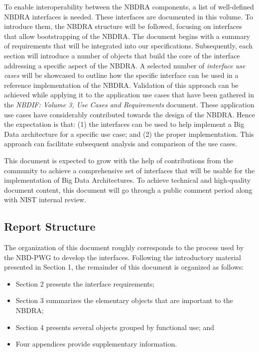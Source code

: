 \documentclass[9pt,]{article}
\providecommand{\tightlist}{%
  \setlength{\itemsep}{0pt}\setlength{\parskip}{0pt}}
\begin{document}
To enable interoperability between the NBDRA components, a list of
well-defined NBDRA interfaces is needed. These interfaces are documented
in this volume. To introduce them, the NBDRA structure will be followed,
focusing on interfaces that allow bootstrapping of the NBDRA. The
document begins with a summary of requirements that will be integrated
into our specifications. Subsequently, each section will introduce a
number of objects that build the core of the interface addressing a
specific aspect of the NBDRA. A selected number of \emph{interface use
cases} will be showcased to outline how the specific interface can be
used in a reference implementation of the NBDRA. Validation of this
approach can be achieved while applying it to the application use cases
that have been gathered in the \emph{NBDIF: Volume 3, Use Cases and
Requirements} document. These application use cases have considerably
contributed towards the design of the NBDRA. Hence the expectation is
that: (1) the interfaces can be used to help implement a Big Data
architecture for a specific use case; and (2) the proper implementation.
This approach can facilitate subsequent analysis and comparison of the
use cases.

This document is expected to grow with the help of contributions from
the community to achieve a comprehensive set of interfaces that will be
usable for the implementation of Big Data Architectures. To achieve
technical and high-quality document content, this document will go
through a public comment period along with NIST internal review.

\hypertarget{report-structure}{%
\subsection{Report Structure}\label{report-structure}}

The organization of this document roughly corresponds to the process
used by the NBD-PWG to develop the interfaces. Following the
introductory material presented in Section 1, the remainder of this
document is organized as follows:

\begin{itemize}
\tightlist
\item
  Section 2 presents the interface requirements;
\item
  Section 3 summarizes the elementary objects that are important to the
  NBDRA;
\item
  Section 4 presents several objects grouped by functional use; and
\item
  Four appendices provide supplementary information.
\end{itemize}
\end{document}
